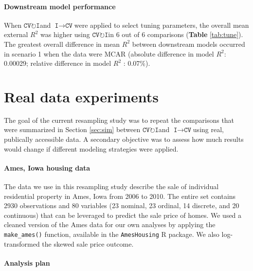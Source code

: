 \documentclass[AMA,STIX1COL,doublespace]{WileyNJD-v2}
\begin{document}
\paragraph{Downstream model performance}

When $\texttt{CV}\!\circlearrowright\!\texttt{I}$\space and
$\texttt{I}\!\!\rightarrow\!\texttt{CV}$\space were applied to select
tuning parameters, the overall mean external \(R^2\) was higher using
$\texttt{CV}\!\circlearrowright\!\texttt{I}$\space in 6 out of 6
comparisons (\textbf{Table} \ref{tab:tune}). The greatest overall
difference in mean \(R^2\) between downstream models occurred in
scenario 1 when the data were MCAR (absolute difference in model
\(R^2\): 0.00029; relative difference in model \(R^2\) : 0.07\%).

\section{Real data experiments} \label{sec:app}

The goal of the current resampling study was to repeat the comparisons
that were summarized in Section \ref{sec:sim} between
$\texttt{CV}\!\circlearrowright\!\texttt{I}$\space and
$\texttt{I}\!\!\rightarrow\!\texttt{CV}$\space using real, publically
accessible data. A secondary objective was to assess how much results
would change if different modeling strategies were applied.

\paragraph{Ames, Iowa housing data}

The data we use in this resampling study describe the sale of individual
residential property in Ames, Iowa from 2006 to 2010. The entire set
contains 2930 observations and 80 variables (23 nominal, 23 ordinal, 14
discrete, and 20 continuous) that can be leveraged to predict the sale
price of homes.\cite{de2011ames} We used a cleaned version of the Ames
data for our own analyses by applying the \texttt{make\_ames()}
function, available in the \texttt{AmesHousing} R
package.\cite{AmesHousing} We also log-transformed the skewed sale price
outcome.

\paragraph{Analysis plan}
\end{document}
